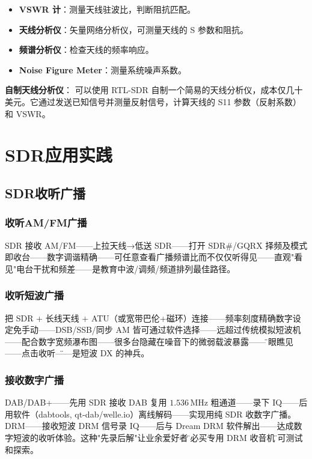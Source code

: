\documentclass[12pt,UTF8]{ctexbook}
\begin{document}
\begin{itemize}[leftmargin=2cm]
    \item \textbf{VSWR 计}：测量天线驻波比，判断阻抗匹配。
    \item \textbf{天线分析仪}：矢量网络分析仪，可测量天线的 S 参数和阻抗。
    \item \textbf{频谱分析仪}：检查天线的频率响应。
    \item \textbf{Noise Figure Meter}：测量系统噪声系数。
\end{itemize}

\textbf{自制天线分析仪}：
可以使用 RTL-SDR 自制一个简易的天线分析仪，成本仅几十美元。它通过发送已知信号并测量反射信号，计算天线的 S11 参数（反射系数）和 VSWR。


\chapter{SDR应用实践}
\label{chap:sdr_applications}

\section{SDR收听广播}
\label{sec:sdr_broadcast}

\subsection{收听AM/FM广播}

SDR 接收 AM/FM——上拉天线→低送 SDR——打开 SDR\#/GQRX 择频及模式即收台——数字调谐精确——可任意查看广播频谱比而不仅仅听得见——直观"看见"电台干扰和频差——是教育中波/调频/频道排列最佳路径。

\subsection{收听短波广播}

把 SDR + 长线天线 + ATU（或宽带巴伦+磁环）连接——频率刻度精确数字设定免手动——DSB/SSB/同步 AM 皆可通过软件选择——远超过传统模拟短波机——配合数字宽频瀑布图——很多台隐藏在噪音下的微弱载波暴露——\"一眼瞧见——点击收听\"——是短波 DX 的神兵。

\subsection{接收数字广播}

DAB/DAB+——先用 SDR 接收 DAB 复用 $1.536\,\mathrm{MHz}$ 粗通道——录下 IQ——后用软件（dabtools, qt-dab/welle.io）离线解码——实现用纯 SDR 收数字广播。DRM——接收短波 DRM 信号录 IQ——后与 Dream DRM 软件解出——达成数字短波的收听体验。这种"先录后解"让业余爱好者\"不必买专用 DRM 收音机\"即可测试和探索。
\end{document}
